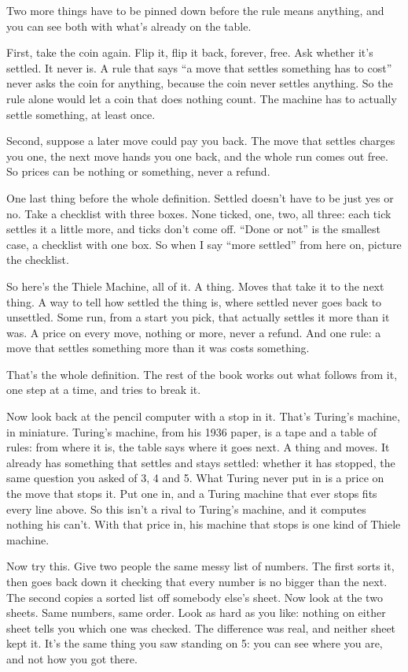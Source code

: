 \documentclass[11pt,twoside]{article}
\theoremstyle{thielethm}
\theoremstyle{thieledef}
\theoremstyle{thieledef}
\theoremstyle{thieledef}
\theoremstyle{thielethm}
\theoremstyle{thieleobs}
\theoremstyle{thielethm}
\begin{document}
Two more things have to be pinned down before the rule means anything, and you can see both with what's already on the table.

First, take the coin again. Flip it, flip it back, forever, free. Ask whether it's settled. It never is. A rule that says ``a move that settles something has to cost'' never asks the coin for anything, because the coin never settles anything. So the rule alone would let a coin that does nothing count. The machine has to actually settle something, at least once.

Second, suppose a later move could pay you back. The move that settles charges you one, the next move hands you one back, and the whole run comes out free. So prices can be nothing or something, never a refund.

One last thing before the whole definition. Settled doesn't have to be just yes or no. Take a checklist with three boxes. None ticked, one, two, all three: each tick settles it a little more, and ticks don't come off. ``Done or not'' is the smallest case, a checklist with one box. So when I say ``more settled'' from here on, picture the checklist.

So here's the Thiele Machine, all of it. A thing. Moves that take it to the next thing. A way to tell how settled the thing is, where settled never goes back to unsettled. Some run, from a start you pick, that actually settles it more than it was. A price on every move, nothing or more, never a refund. And one rule: a move that settles something more than it was costs something.

That's the whole definition. The rest of the book works out what follows from it, one step at a time, and tries to break it.

Now look back at the pencil computer with a stop in it. That's Turing's machine, in miniature. Turing's machine, from his 1936 paper, is a tape and a table of rules: from where it is, the table says where it goes next. A thing and moves. It already has something that settles and stays settled: whether it has stopped, the same question you asked of 3, 4 and 5. What Turing never put in is a price on the move that stops it. Put one in, and a Turing machine that ever stops fits every line above. So this isn't a rival to Turing's machine, and it computes nothing his can't. With that price in, his machine that stops is one kind of Thiele machine.

Now try this. Give two people the same messy list of numbers. The first sorts it, then goes back down it checking that every number is no bigger than the next. The second copies a sorted list off somebody else's sheet. Now look at the two sheets. Same numbers, same order. Look as hard as you like: nothing on either sheet tells you which one was checked. The difference was real, and neither sheet kept it. It's the same thing you saw standing on 5: you can see where you are, and not how you got there.
\end{document}
